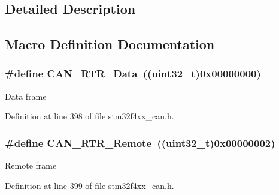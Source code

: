 \subsection{Detailed Description}


\subsection{Macro Definition Documentation}
\hypertarget{group___c_a_n__remote__transmission__request_ga2407c3a8b2cd97bd651143aa959219f1}{
\subsubsection[{C\-A\-N\-\_\-\-R\-T\-R\-\_\-\-Data}]{\setlength{\rightskip}{0pt plus 5cm}\#define C\-A\-N\-\_\-\-R\-T\-R\-\_\-\-Data~((uint32\-\_\-t)0x00000000)}}\label{group___c_a_n__remote__transmission__request_ga2407c3a8b2cd97bd651143aa959219f1}
Data frame 

Definition at line 398 of file stm32f4xx\-\_\-can.\-h.

\hypertarget{group___c_a_n__remote__transmission__request_ga42e95ddfb02d88c82de84058fb0fb349}{
\subsubsection[{C\-A\-N\-\_\-\-R\-T\-R\-\_\-\-Remote}]{\setlength{\rightskip}{0pt plus 5cm}\#define C\-A\-N\-\_\-\-R\-T\-R\-\_\-\-Remote~((uint32\-\_\-t)0x00000002)}}\label{group___c_a_n__remote__transmission__request_ga42e95ddfb02d88c82de84058fb0fb349}
Remote frame 

Definition at line 399 of file stm32f4xx\-\_\-can.\-h.

